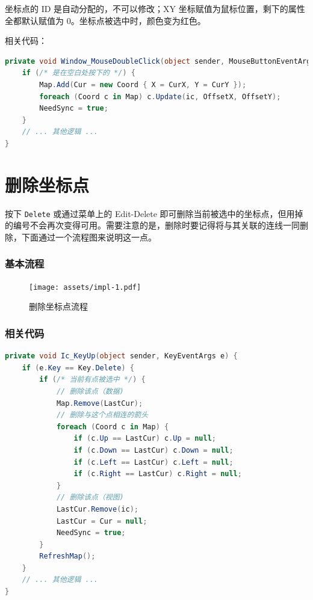 坐标点的 ID 是自动分配的，不可以修改；XY 坐标赋值为鼠标位置，剩下的属性全都默认赋值为 0。坐标点被选中时，颜色变为红色。

相关代码：

\begin{lstlisting}[language=cs]
private void Window_MouseDoubleClick(object sender, MouseButtonEventArgs e) {
    if (/* 是在空白处按下的 */) {
        Map.Add(Cur = new Coord { X = CurX, Y = CurY });
        foreach (Coord c in Map) c.Update(ic, OffsetX, OffsetY);
        NeedSync = true;
    }
    // ... 其他逻辑 ...
}
\end{lstlisting}

\section{删除坐标点}

按下 \texttt{Delete} 或通过菜单上的 Edit-Delete 即可删除当前被选中的坐标点，但用掉的编号不会再次变得可用。需要注意的是，删除时要记得将与其关联的连线一同删除，下面通过一个流程图来说明这一点。

\subsubsection{基本流程}

\begin{figure}[H]
    \centering
    \texttt{[image: assets/impl-1.pdf]}
    \caption{删除坐标点流程}
    \label{fig:impl-1}
\end{figure}

\subsubsection{相关代码}

\begin{lstlisting}[language=cs]
private void Ic_KeyUp(object sender, KeyEventArgs e) {
    if (e.Key == Key.Delete) {
        if (/* 当前有点被选中 */) {
            // 删除该点（数据)
            Map.Remove(LastCur);
            // 删除与这个点相连的箭头
            foreach (Coord c in Map) {
                if (c.Up == LastCur) c.Up = null;
                if (c.Down == LastCur) c.Down = null;
                if (c.Left == LastCur) c.Left = null;
                if (c.Right == LastCur) c.Right = null;
            }
            // 删除该点（视图)
            LastCur.Remove(ic);
            LastCur = Cur = null;
            NeedSync = true;
        }
        RefreshMap();
    }
    // ... 其他逻辑 ...
}
\end{lstlisting}

